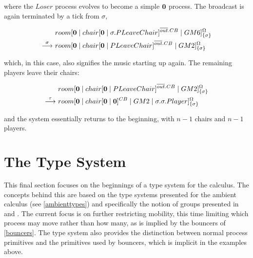 \noindent where the $Loser$ process evolves to become a simple $\textbf{0}$
process.  The broadcast is again terminated by a tick from $\sigma$,

\begin{equation}
\begin{aligned}
&  {room}[ \textbf{0} \;|\; {chair}[ \textbf{0} \;|\; \sigma.PLeaveChair ]^{\overline{out}.CB} \;|\;
   GM6 ]^{\Omega}_{\{\sigma\}} \\
\stackrel{\sigma}{\longrightarrow}\ & {room}[ \textbf{0} \;|\; {chair}[ \textbf{0} \;|\; PLeaveChair ]^{\overline{out}.CB} \;|\;
   GM2 ]^{\Omega}_{\{\sigma\}} 
\end{aligned}
\end{equation}

\noindent which, in this case, also signifies the music starting up again.  The
remaining players leave their chairs:

\begin{equation}
\begin{aligned}
& {room}[ \textbf{0} \;|\; {chair}[ \textbf{0} \;|\; PLeaveChair ]^{\overline{out}.CB} \;|\;
   GM2 ]^{\Omega}_{\{\sigma\}}   \\
\stackrel{\tau}{\longrightarrow}\ & {room}[ \textbf{0} \;|\; {chair}[ \textbf{0} \;|\; \textbf{0} ]^{CB} \;|\;
   GM2 \;|\; \sigma.\sigma.Player ]^{\Omega}_{\{\sigma\}} 
\end{aligned}
\end{equation}

\noindent and the system essentially returns to the beginning, with $n -
1$ chairs and $n - 1$ players.

\section{The Type System}
\label{typesys}

This final section focuses on the beginnings of a type system for the
calculus.  The concepts behind this are based on the type systems
presented for the ambient calculus (see \ref{ambienttypes}) and
specifically the notion of groups presented in \cite{ambienttypes} and
\cite{m3}.  The current focus is on further restricting mobility, this
time limiting which process may move rather than how many, as is implied
by the bouncers of \ref{bouncers}.  The type system also provides the
distinction between normal process primitives and the primitives used by
bouncers, which is implicit in the examples above.

